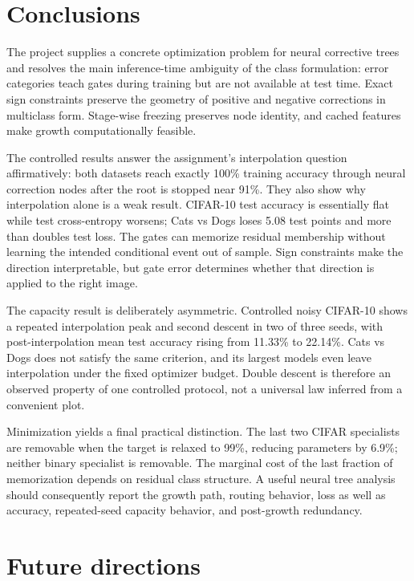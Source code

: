 \documentclass[11pt,a4paper]{article}
\begin{document}
\section{Conclusions}

The project supplies a concrete optimization problem for neural corrective
trees and resolves the main inference-time ambiguity of the class formulation:
error categories teach gates during training but are not available at test
time. Exact sign constraints preserve the geometry of positive and negative
corrections in multiclass form. Stage-wise freezing preserves node identity,
and cached features make growth computationally feasible.

The controlled results answer the assignment's interpolation question
affirmatively: both datasets reach exactly 100\% training accuracy through
neural correction nodes after the root is stopped near 91\%. They also show why
interpolation alone is a weak result. CIFAR-10 test accuracy is essentially
flat while test cross-entropy worsens; Cats vs Dogs loses 5.08 test points and
more than doubles test loss. The gates can memorize residual membership without
learning the intended conditional event out of sample. Sign constraints make
the direction interpretable, but gate error determines whether that direction
is applied to the right image.

The capacity result is deliberately asymmetric. Controlled noisy CIFAR-10
shows a repeated interpolation peak and second descent in two of three seeds,
with post-interpolation mean test accuracy rising from 11.33\% to 22.14\%.
Cats vs Dogs does not satisfy the same criterion, and its largest models even
leave interpolation under the fixed optimizer budget. Double descent is
therefore an observed property of one controlled protocol, not a universal
law inferred from a convenient plot.

Minimization yields a final practical distinction. The last two CIFAR
specialists are removable when the target is relaxed to 99\%, reducing
parameters by 6.9\%; neither binary specialist is removable. The marginal cost
of the last fraction of memorization depends on residual class structure. A
useful neural tree analysis should consequently report the growth path, routing
behavior, loss as well as accuracy, repeated-seed capacity behavior, and
post-growth redundancy.

\section{Future directions}
\end{document}
